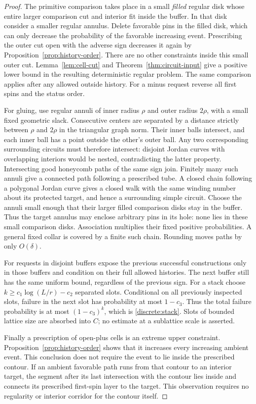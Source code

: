 \documentclass[11pt]{article}
\theoremstyle{definition}
\theoremstyle{remark}
\numberwithin{equation}{section}
\begin{document}
\begin{proof}
The primitive comparison takes place in a small \emph{filled} regular
disk whose entire larger comparison cut and interior fit inside the
buffer. In that disk consider a smaller regular annulus. Delete
favorable pins in the filled disk, which
can only decrease the probability of the favorable increasing event.
Prescribing the outer cut open with the adverse sign decreases it again
by Proposition~\ref{prop:history-order}. There are no other constraints
inside this small outer cut. Lemma~\ref{lem:cell-cut} and
Theorem~\ref{thm:circuit-input} give a positive lower bound in the
resulting deterministic regular problem. The same comparison applies
after any allowed outside history. For a minus request reverse all first
spins and the status order.

For gluing, use regular annuli of inner radius $\rho$ and outer radius
$2\rho$, with a small fixed geometric slack. Consecutive centers are
separated by a distance strictly between $\rho$ and $2\rho$ in the
triangular graph norm. Their inner balls intersect, and each inner ball
has a point outside the other's outer ball. Any two corresponding
surrounding circuits must therefore intersect: disjoint Jordan curves
with overlapping interiors would be nested, contradicting the latter
property. Intersecting good honeycomb paths of the same sign join.
Finitely many such annuli give a connected path following a prescribed
tube. A closed chain following a polygonal Jordan curve gives a closed
walk with the same winding number about its protected target, and hence
a surrounding simple circuit. Choose the annuli small enough that their
larger filled comparison disks stay in the buffer. Thus the target
annulus may enclose arbitrary pins in its hole: none lies in these small
comparison disks. Association multiplies their
fixed positive probabilities. A general fixed collar is covered by a
finite such chain. Rounding moves paths by only $O(\delta)$.

For requests in disjoint buffers expose the previous successful
constructions only in those buffers and condition on their full allowed
histories. The next buffer still has the same uniform bound, regardless
of the previous sign. For a stack choose $k\ge c_1\log(L/r)-c_2$
separated slots. Conditional on all previously inspected slots, failure
in the next slot has probability at most $1-c_3$. Thus the total failure
probability is at most $(1-c_3)^k$, which is
\eqref{discrete:stack}. Slots of bounded lattice size are absorbed into
$C$; no estimate at a sublattice scale is asserted.

Finally a prescription of open-plus cells is an extreme upper constraint.
Proposition~\ref{prop:history-order} shows that it increases every
increasing ambient event. This conclusion does not require the event to
lie inside the prescribed contour. If an ambient favorable path runs
from that contour to an interior target, the segment after its last
intersection with the contour lies inside and connects its prescribed
first-spin layer to the target. This observation requires no regularity
or interior corridor for the contour itself.
\end{proof}
\end{document}
